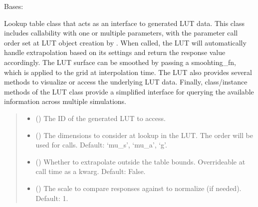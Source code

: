 \documentclass[letterpaper,10pt,english]{sphinxmanual}
\begin{document}
\begin{fulllineitems}
\label{\detokenize{generated/photon_canon.lut.lut:photon_canon.lut.lut.LUT}}
\pysigstartsignatures
\pysiglinewithargsret
{}
{}
{}
\pysigstopsignatures
\sphinxAtStartPar
Bases: 

\sphinxAtStartPar
Lookup table class that acts as an interface to generated LUT data. This class includes callability with one or
multiple parameters, with the parameter call order set at LUT object creation by . When called, the LUT
will automatically handle extrapolation based on its settings and return the response value accordingly. The LUT
surface can be smoothed by passing a smoohting\_fn, which is applied to the grid at interpolation time. The LUT also
provides several methods to visualize or access the underlying LUT data. Finally, class/instance methods of the LUT
class provide a simplified interface for querying the available information across multiple simulations.
\begin{quote}\begin{description}
\begin{itemize}
\item {} 
\sphinxAtStartPar
{} () \textendash{} The ID of the generated LUT to access.

\item {} 
\sphinxAtStartPar
{} (\sphinxstyleliteralemphasis{\sphinxupquote{{[}}}\sphinxstyleliteralemphasis{\sphinxupquote{{]}}}) \textendash{} The dimensions to consider at lookup in the LUT. The order will be used for calls. Default: ‘mu\_s’, ‘mu\_a’, ‘g’.

\item {} 
\sphinxAtStartPar
{} () \textendash{} Whether to extrapolate outside the table bounds. Overrideable at call time as a kwarg. Default: False.

\item {} 
\sphinxAtStartPar
{} () \textendash{} The scale to compare responses against to normalize (if needed). Default: 1.


\end{itemize}
\end{description}
\end{quote}
\end{fulllineitems}
\end{document}
